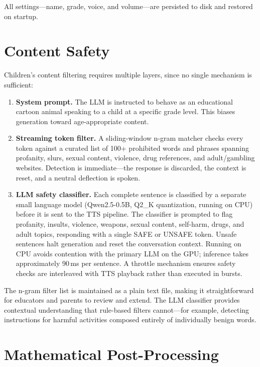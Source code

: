 \documentclass[11pt]{article}
\begin{document}
\noindent All settings---name, grade, voice, and volume---are persisted to disk and restored on startup.

\section{Content Safety}

Children's content filtering requires multiple layers, since no single mechanism is sufficient:

\begin{enumerate}[nosep]
  \item \textbf{System prompt.} The LLM is instructed to behave as an educational cartoon animal speaking to a child at a specific grade level. This biases generation toward age-appropriate content.
  \item \textbf{Streaming token filter.} A sliding-window n-gram matcher checks every token against a curated list of 100+ prohibited words and phrases spanning profanity, slurs, sexual content, violence, drug references, and adult/gambling websites. Detection is immediate---the response is discarded, the context is reset, and a neutral deflection is spoken.
  \item \textbf{LLM safety classifier.} Each complete sentence is classified by a separate small language model (Qwen2.5-0.5B, Q2\_K quantization, running on CPU) before it is sent to the TTS pipeline. The classifier is prompted to flag profanity, insults, violence, weapons, sexual content, self-harm, drugs, and adult topics, responding with a single SAFE or UNSAFE token. Unsafe sentences halt generation and reset the conversation context. Running on CPU avoids contention with the primary LLM on the GPU; inference takes approximately 90\,ms per sentence. A throttle mechanism ensures safety checks are interleaved with TTS playback rather than executed in bursts.
\end{enumerate}

\noindent The n-gram filter list is maintained as a plain text file, making it straightforward for educators and parents to review and extend. The LLM classifier provides contextual understanding that rule-based filters cannot---for example, detecting instructions for harmful activities composed entirely of individually benign words.

\section{Mathematical Post-Processing}
\end{document}
